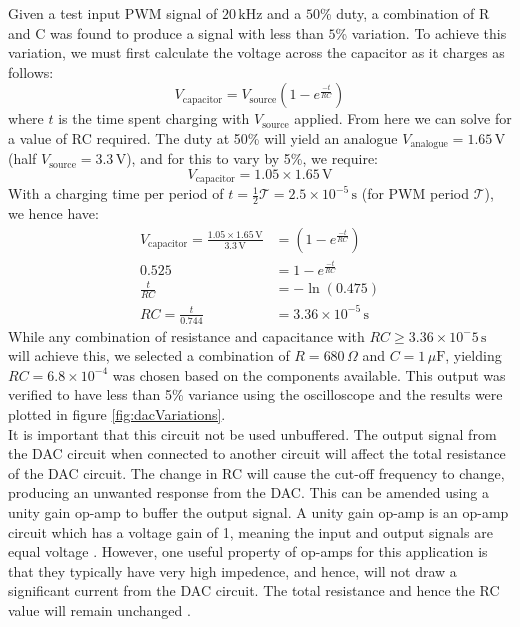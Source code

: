 \documentclass[%
 reprint,
 amsmath,amssymb,
 aps,
]{revtex4-2}
\begin{document}
    Given a test input PWM signal of $20\,\text{kHz}$ and a $50$\% duty, a combination of R and C was found to produce a signal with less than $5$\% variation. To achieve this variation, we must first calculate the voltage across the capacitor as it charges as follows:
    \begin{equation}
        V_\text{capacitor} = V_\text{source} \left( 1 - e^{\frac{-t}{RC}} \right)
    \end{equation}where $t$ is the time spent charging with $V_\text{source}$ applied. From here we can solve for a value of RC required. The duty at 50\% will yield an analogue $V_\text{analogue} = 1.65 \,\text{V}$ (half $V_\text{source}=3.3\,\text{V}$), and for this to vary by 5\%, we require:
    \begin{equation}
        V_\text{capacitor} = 1.05 \times 1.65 \,\text{V}
    \end{equation}
    With a charging time per period of $t = \frac{1}{2} \mathcal{T} = 2.5 \times 10^{-5} \,\text{s}$ (for PWM period $\mathcal{T}$), we hence have:
    \begin{align}
        V_\text{capacitor} = \frac{1.05 \times 1.65 \,\text{V}}{3.3\,\text{V}} &= \left( 1 - e^{\frac{-t}{RC}} \right)\\
        0.525 &= 1 - e^\frac{-t}{RC}\nonumber\\
        \frac{t}{RC} &= - \ln(0.475)\nonumber\\
        RC = \frac{t}{0.744} &= 3.36 \times 10^{-5} \,\text{s}
    \end{align}
    While any combination of resistance and capacitance with $RC \ge 3.36 \times 10^-5 \,\text{s}$ will achieve this, we selected a combination of $R=680\,\Omega$ and $C=1\,\mu\text{F}$, yielding $RC=6.8\times 10^{-4}$ was chosen based on the components available. This output was verified to have less than 5\% variance using the oscilloscope and the results were plotted in figure \ref{fig:dacVariations}.\\

    It is important that this circuit not be used unbuffered. The output signal from the DAC circuit when connected to another circuit will affect the total resistance of the DAC circuit. The change in RC will cause the cut-off frequency to change, producing an unwanted response from the DAC. This can be amended using a unity gain op-amp to buffer the output signal. A unity gain op-amp is an op-amp circuit which has a voltage gain of 1, meaning the input and output signals are equal voltage \cite{unityGain}. However, one useful property of op-amps for this application is that they typically have very high impedence, and hence, will not draw a significant current from the DAC circuit. The total resistance and hence the RC value will remain unchanged \cite{unityGain}.
\end{document}
